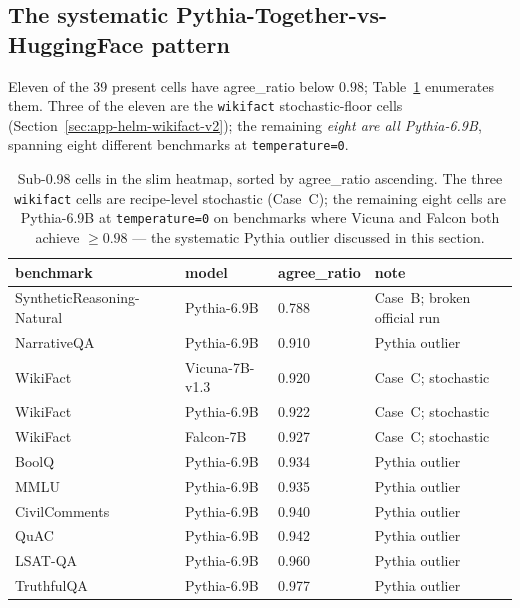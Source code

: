 \subsection{The systematic Pythia-Together-vs-HuggingFace pattern}
\label{sec:app-helm-pythia-pattern-v2}

Eleven of the 39 present cells have agree\_ratio below $0.98$;
  Table~\ref{tab:helm-sub98-v2} enumerates them.
Three of the eleven are the \texttt{wikifact} stochastic-floor cells
  (Section~\ref{sec:app-helm-wikifact-v2}); the remaining \emph{eight
  are all Pythia-6.9B}, spanning eight different benchmarks at
  \texttt{temperature=0}.

\begin{table}[htbp]
\centering
\small
\caption{Sub-0.98 cells in the slim heatmap, sorted by agree\_ratio
  ascending.
The three \texttt{wikifact} cells are recipe-level stochastic
  (Case~C); the remaining eight cells are Pythia-6.9B at
  \texttt{temperature=0} on benchmarks where Vicuna and Falcon both
  achieve $\geq 0.98$ — the systematic Pythia outlier discussed in
  this section.}
\label{tab:helm-sub98-v2}
\begin{tabular}{llll}
\toprule
benchmark & model & agree\_ratio & note \\
\midrule
SyntheticReasoning-Natural & Pythia-6.9B           & 0.788 & Case~B; broken official run \\
NarrativeQA                & Pythia-6.9B           & 0.910 & Pythia outlier \\
WikiFact                   & Vicuna-7B-v1.3        & 0.920 & Case~C; stochastic \\
WikiFact                   & Pythia-6.9B           & 0.922 & Case~C; stochastic \\
WikiFact                   & Falcon-7B             & 0.927 & Case~C; stochastic \\
BoolQ                      & Pythia-6.9B           & 0.934 & Pythia outlier \\
MMLU                       & Pythia-6.9B           & 0.935 & Pythia outlier \\
CivilComments              & Pythia-6.9B           & 0.940 & Pythia outlier \\
QuAC                       & Pythia-6.9B           & 0.942 & Pythia outlier \\
LSAT-QA                    & Pythia-6.9B           & 0.960 & Pythia outlier \\
TruthfulQA                 & Pythia-6.9B           & 0.977 & Pythia outlier \\
\bottomrule
\end{tabular}
\end{table}

